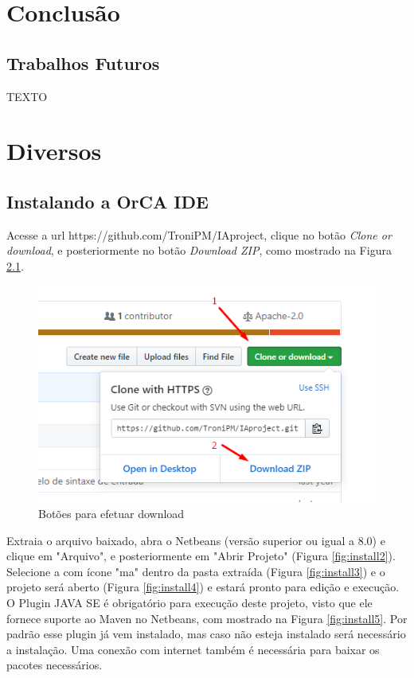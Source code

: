 \documentclass{bcc}
\begin{document}
\chapter{Conclusão}
\label{chap:conclusao}

\section{Trabalhos Futuros}

TEXTO




\appendix
\chapter{Diversos}
\section{Instalando a OrCA IDE}
Acesse a url https://github.com/TroniPM/IAproject, clique no botão \textit{Clone or download}, e posteriormente no botão \textit{Download ZIP}, como mostrado na Figura \ref{fig:install1}.

\begin{figure}[H]
\centering
\includegraphics[width=.7\textwidth]{Figuras/install1.png}
\caption{Botões para efetuar download} 
\label{fig:install1}
\end{figure}

Extraia o arquivo baixado, abra o Netbeans (versão superior ou igual a 8.0) e clique em "Arquivo", e posteriormente em "Abrir Projeto" (Figura \ref{fig:install2}). Selecione a com ícone "ma" dentro da pasta extraída (Figura \ref{fig:install3}) e o projeto será aberto (Figura \ref{fig:install4}) e estará pronto para edição e execução. O Plugin JAVA SE é obrigatório para execução deste projeto, visto que ele fornece suporte ao Maven no Netbeans, com mostrado na Figura \ref{fig:install5}. Por padrão esse plugin já vem instalado, mas caso não esteja instalado será necessário a instalação. Uma conexão com internet também é necessária para baixar os pacotes necessários.
\end{document}
